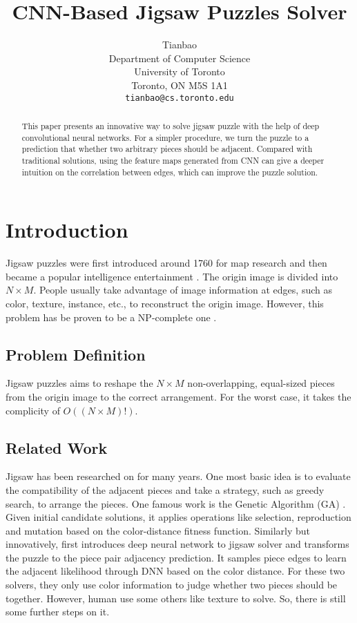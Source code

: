 \documentclass{article}
\title{CNN-Based Jigsaw Puzzles Solver}
\author{Tianbao\\
  Department of Computer Science\\
  University of Toronto\\
  Toronto, ON M5S 1A1 \\
  \texttt{tianbao@cs.toronto.edu} \\
}
\begin{document}

\maketitle

\begin{abstract}

This paper presents an innovative way to solve jigsaw puzzle with the help of deep convolutional neural networks. For a simpler procedure, we turn the puzzle to a prediction that whether two arbitrary pieces should be adjacent. Compared with traditional solutions, using the feature maps generated from CNN can give a deeper intuition on the correlation between edges, which can improve the puzzle solution.

\end{abstract}

\section{Introduction}

Jigsaw puzzles were first introduced around 1760 for map research and then became a popular intelligence entertainment \cite{freeman1964apictorial}. The origin image is divided into $N\times M$. People usually take advantage of image information at edges, such as color, texture, instance, etc., to reconstruct the origin image. However, this problem has be proven to be a NP-complete one \cite{altman1989solving,demaine2007jigsaw}.

\subsection{Problem Definition}

Jigsaw puzzles aims to reshape the $N\times M$ non-overlapping, equal-sized pieces from the origin image to the correct arrangement. For the worst case, it takes the complicity of $O((N\times M)!)$.

\subsection{Related Work}

Jigsaw has been researched on for many years. One most basic idea is to evaluate the compatibility of the adjacent pieces and take a strategy, such as greedy search, to arrange the pieces. One famous work is the Genetic Algorithm (GA) \cite{sholomon2013genetic}. Given initial candidate solutions, it applies operations like selection, reproduction and mutation based on the color-distance fitness function. Similarly but innovatively, \cite{sholomon2016dnn} first introduces deep neural network to jigsaw solver and transforms the puzzle to the piece pair adjacency prediction. It samples piece edges to learn the adjacent likelihood through DNN based on the color distance. For these two solvers, they only use color information to judge whether two pieces should be together. However, human use some others like texture to solve. So, there is still some further steps on it.
\end{document}
